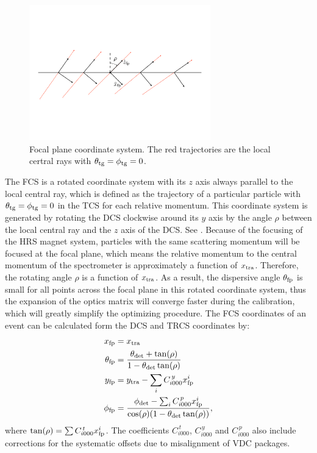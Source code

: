 \begin{figure}[b!]
  \centering
  \includegraphics[width=0.7\textwidth]{figs/FCS.pdf}
  \caption[Focal plane coordinate system.]{Focal plane coordinate system. The red trajectories are the local certral rays with $\theta_{\mathrm{tg}}=\phi_{\mathrm{tg}}=0$. \label{C6S1SS5F1}}
\end{figure}

The FCS is a rotated coordinate system with its $z$ axis always parallel to the local central ray, which is defined as the trajectory of a particular particle with $\theta_{\mathrm{tg}}=\phi_{\mathrm{tg}}=0$ in the TCS for each relative momentum. This coordinate system is generated by rotating the DCS clockwise around its $y$ axis by the angle $\rho$ between the local central ray and the $z$ axis of the DCS. See . Because of the focusing of the HRS magnet system, particles with the same scattering momentum will be focused at the focal plane, which means the relative momentum to the central momentum of the spectrometer is approximately a function of $x_{\mathrm{tra}}$. Therefore, the rotating angle $\rho$ is a function of $x_{\mathrm{tra}}$. As a result, the dispersive angle $\theta_{\mathrm{fp}}$ is small for all points across the focal plane in this rotated coordinate system, thus the expansion of the optics matrix will converge faster during the calibration, which will greatly simplify the optimizing procedure. The FCS coordinates of an event can be calculated form the DCS and TRCS coordinates by:
\begin{align} \label{C6S1SS5E1}
x_{\mathrm{fp}} & = x_{\mathrm{tra}} \\ \label{C6S1SS5E2}
\theta_{\mathrm{fp}} & = \frac{\theta_{\mathrm{det}}+\tan(\rho)}{1-\theta_{\mathrm{det}}\tan(\rho)} \\ \label{C6S1SS5E3}
y_{\mathrm{fp}} & = y_{\mathrm{tra}}-\sum_i C_{i000}^{\,y} x_{\mathrm{fp}}^i \\ \label{C6S1SS5E4}
\phi_{\mathrm{fp}} & = \frac{\phi_{\mathrm{det}}-\sum_i C_{i000}^{\,p}x_{\mathrm{fp}}^i}{\cos(\rho)(1-\theta_{\mathrm{det}}\tan(\rho))},
\end{align}
where $\tan(\rho) = \sum C_{i000}^{\,t} x_{\mathrm{fp}}^i$. The coefficients $C_{i000}^{\,t}$, $C_{i000}^{\,y}$ and $C_{i000}^{\,p}$ also include corrections for the systematic offsets due to misalignment of VDC packages.

